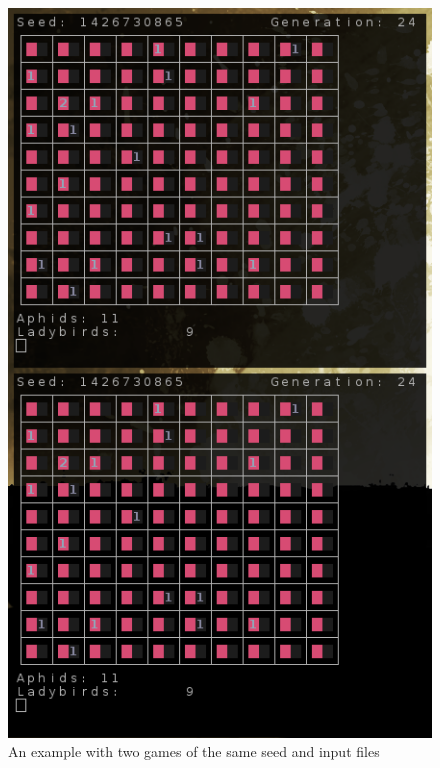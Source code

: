 \documentclass[10pt]{article}
\begin{document}
        \begin{figure}[bh]
            \centering
            \includegraphics[scale=0.5]{sameSeeds.png}
            \caption{An example with two games of the same seed and input files}
        \end{figure}
 
\end{document}
